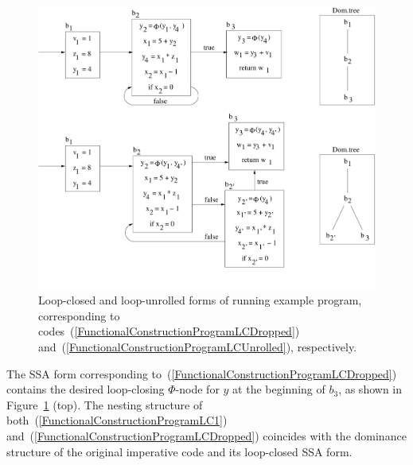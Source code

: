 \begin{figure}
\begin{center}
\includegraphics[scale=0.4]{SSAConstructionExample6}
\end{center}
\caption{\label{fig:FunctionalCorrespondenceSSAofLoopClosedProgramNEW} Loop-closed and loop-unrolled forms of running example program, corresponding to codes~(\ref{FunctionalConstructionProgramLCDropped}) and~(\ref{FunctionalConstructionProgramLCUnrolled}), respectively.}
\end{figure}
The SSA form corresponding
to~(\ref{FunctionalConstructionProgramLCDropped}) contains the desired
loop-closing $\Phi$-node for $y$ at the beginning of $b_3$, as shown
in Figure~\ref{fig:FunctionalCorrespondenceSSAofLoopClosedProgramNEW}
(top). The nesting structure of
both~(\ref{FunctionalConstructionProgramLC1})
and~(\ref{FunctionalConstructionProgramLCDropped}) coincides with the
dominance structure of the original imperative code and its
loop-closed SSA form.

